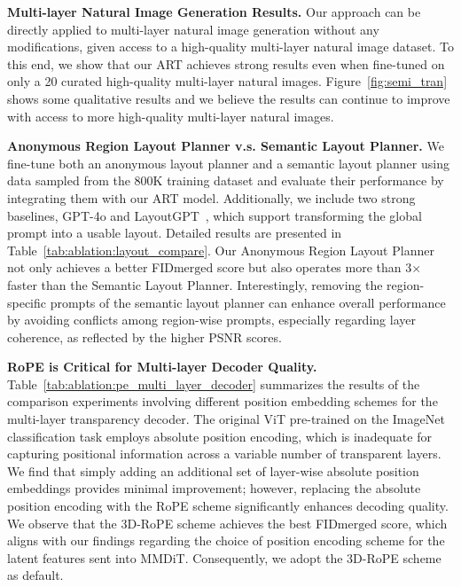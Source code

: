 \vspace{1mm}
\noindent\textbf{Multi-layer Natural Image Generation Results.}
Our approach can be directly applied to multi-layer natural image generation without any modifications, given access to a high-quality multi-layer natural image dataset. To this end, we show that our ART achieves strong results even when fine-tuned on only a 20 curated high-quality multi-layer natural images. Figure~\ref{fig:semi_tran} shows some qualitative results and we believe the results can continue to improve with access to more high-quality multi-layer natural images.


\vspace{1mm}
\noindent\textbf{Anonymous Region Layout Planner v.s. Semantic Layout Planner.} We fine-tune both an anonymous layout planner and a semantic layout planner using data sampled from the 800K training dataset and evaluate their performance by integrating them with our ART model. Additionally, we include two strong baselines, GPT-4o and LayoutGPT~\cite{feng2024layoutgpt}, which support transforming the global prompt into a usable layout. Detailed results are presented in Table~\ref{tab:ablation:layout_compare}. Our Anonymous Region Layout Planner not only achieves a better FID$\scriptstyle \text{merged}$ score but also operates more than 3$\times$ faster than the Semantic Layout Planner.
Interestingly, removing the region-specific prompts of the semantic layout planner can enhance overall performance by avoiding conflicts among region-wise prompts, especially regarding layer coherence, as reflected by the higher PSNR scores.


\vspace{1mm}
\noindent\textbf{RoPE is Critical for Multi-layer Decoder Quality.}
Table~\ref{tab:ablation:pe_multi_layer_decoder} summarizes the results of the comparison experiments involving different position embedding schemes for the multi-layer transparency decoder. The original ViT pre-trained on the ImageNet classification task employs absolute position encoding, which is inadequate for capturing positional information across a variable number of transparent layers. We find that simply adding an additional set of layer-wise absolute position embeddings provides minimal improvement; however, replacing the absolute position encoding with the RoPE scheme significantly enhances decoding quality. We observe that the 3D-RoPE scheme achieves the best FID$\scriptstyle \text{merged}$ score, which aligns with our findings regarding the choice of position encoding scheme for the latent features sent into MMDiT. Consequently, we adopt the 3D-RoPE scheme as default.


